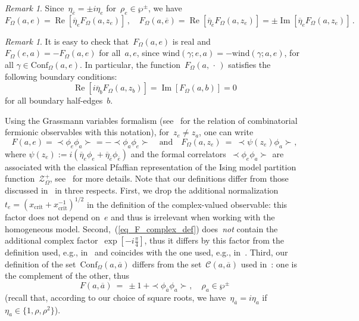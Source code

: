 \documentclass[reqno,11pt,a4paper]{amsart}
\theoremstyle{remark}
\newtheorem{remark}[proposition]{Remark}
\newcommand{\wind}{\mathrm{wind}}
\newcommand{\F}{F_\Omega}       \newcommand{\Fdelta}{F_{\Omega_\delta}}
\newcommand{\conf}{\mathrm{Conf}}
\renewcommand\Re{\operatorname{Re}}
\renewcommand\Im{\operatorname{Im}}
\newcommand\CorrFerm[2]{\prec\! #2 \!\succ_{#1}{}}
\newcommand\ConfO[1]{\conf_\Omega(#1)}
\def\cZ{\mathcal Z}
\begin{document}
\begin{remark} \label{rem:fermionic-via-Grassmann}
Since~$\eta_{\overline{e}}=\pm i\eta_e$ for~$\rho_e\in\wp^\pm$, we have
\begin{equation}
\label{eq_F_real_via_complex}
\F(a,e)=\Re[\overline{\eta}_e\F(a,z_e)]\,,\quad \F(a,\overline{e})=\Re[\overline{\eta}_{\overline{e}}\F(a,z_e)]=\pm\Im[\overline{\eta}_e\F(a,z_e)]\,.
\end{equation}

\begin{remark}
\label{rem:bvp_in_discrete}
It is easy to check that~$\F(a,e)$ is real and~$\F(e,a)=-\F(a,e)$ for all~$a,e$, since
$\wind(\gamma;e,a)=-\wind(\gamma;a,e)$, for all $\gamma\in\ConfO{a,e}$.
In particular, the function~$\F(a,\,\cdot\,)$ satisfies the following boundary conditions:
\begin{equation}
\label{eq_F_boundary_conditions}
\Re[i\overline{\eta}_b\F(a,z_b)]=\Im[\F(a,b)]=0
\end{equation}
for all boundary half-edges~$b$.
\end{remark}

Using the Grassmann variables formalism (see~\cite[Sections~3.2,3.6]{CheCimKas15} for the relation of combinatorial fermionic observables with this notation), for~$z_e\ne z_a$, one can write
\[
F(a,e)=\CorrFerm{}{\phi_e\phi_a}=-\CorrFerm{}{\phi_a\phi_e}\quad \text{and}\quad \F(a,z_e)~=~\CorrFerm{}{\psi(z_e)\phi_a},
\]
where $\psi(z_e):=i(\overline{\eta}_e\phi_e+\overline{\eta}_{\overline{e}}\phi_{\overline{e}})$ and the formal correlators~$\CorrFerm{}{\phi_e\phi_a}$ are associated with the classical Pfaffian representation of the Ising model partition function~$\cZ_\Omega^+$, see~\cite{CheCimKas15} for more details. Note that our definitions differ from those discussed in~\cite{CheCimKas15} in three respects. First, we drop the additional normalization~$t_e=(x_{\mathrm{crit}}+x_{\mathrm{crit}}^{-1})^{1/2}$ in the definition of the complex-valued observable: this factor does not depend on~$e$ and thus is irrelevant when working with the homogeneous model. Second,~(\ref{eq_F_complex_def}) does~\emph{not} contain the additional complex factor~$\exp[-i\frac{\pi}{4}]$, thus it differs by this factor from the definition used, e.g., in~\cite{CheSmi12,CheIzy13,CheCimKas15} and coincides with the one used, e.g., in~\cite{HonSmi13,Hon10,CheHonIzy15}. Third, our definition of the set~$\ConfO{a,\overline{a}}$ differs from the set~$\mathcal{C}(a,\overline{a})$ used in~\cite[Theorem~1.2]{CheCimKas15}: one is the complement of the other, thus
\[
F(a,\overline{a})~=~\pm 1~+\CorrFerm{}{\phi_{\overline{a}}\phi_{a}},\quad \rho_a\in\wp^\pm
\]
(recall that, according to our choice of square roots, we have~$\eta_{\overline{a}}=i\eta_a$ if~$\eta_a\in\{1,\rho,\rho^2\}$).
\end{remark}
\end{document}
